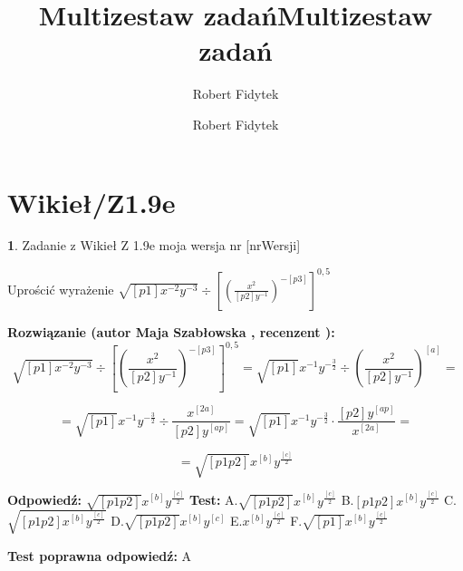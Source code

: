 \documentclass[12pt, a4paper]{article}
\title{Multizestaw zadań}
\author{Robert Fidytek}
\date{}\documentclass[12pt, a4paper]{article}
\title{Multizestaw zadań}
\author{Robert Fidytek}
\date{}
\theoremstyle{definition} %
\newtheorem{zad}{}
\theoremstyle{definition} %
\newtheorem{zad}{}
\newcommand{\kategoria}[1]{\section{#1}} %
\newcommand{\zadStart}[1]{\begin{zad}#1\newline} %
\newcommand{\zadStop}{\end{zad}}   %
\newcommand{\rozwStart}[2]{\noindent \textbf{Rozwiązanie (autor #1 , recenzent #2): }\newline} %
\newcommand{\rozwStop}{\newline}                                            %
\newcommand{\odpStart}{\noindent \textbf{Odpowiedź:}\newline}    %
\newcommand{\odpStop}{\newline}                                             %
\newcommand{\testStart}{\noindent \textbf{Test:}\newline} %
\newcommand{\testStop}{\newline} %
\newcommand{\kluczStart}{\noindent \textbf{Test poprawna odpowiedź:}\newline} %
\newcommand{\kluczStop}{\newline} %
\begin{document}
\maketitle


\kategoria{Wikieł/Z1.9e}
\zadStart{Zadanie z Wikieł Z 1.9e moja wersja nr [nrWersji]}


Uprościć wyrażenie $\sqrt{[p1]x^{-2}y^{-3}}\div[(\frac{x^{2}}{[p2]y^{-1}})^{-[p3]}]^{0,5}$

\zadStop

\rozwStart{Maja Szabłowska}{}
$$\sqrt{[p1]x^{-2}y^{-3}}\div\left[\left(\frac{x^{2}}{[p2]y^{-1}}\right)^{-[p3]}\right]^{0,5}=\sqrt{[p1]}x^{-1}y^{-\frac{3}{2}}\div\left(\frac{x^{2}}{[p2]y^{-1}}\right)^{[a]}=$$

$$=\sqrt{[p1]}x^{-1}y^{-\frac{3}{2}}\div \frac{x^{[2a]}}{[p2]y^{[ap]}}= \sqrt{[p1]}x^{-1}y^{-\frac{3}{2}}\cdot \frac{[p2]y^{[ap]}}{x^{[2a]}}=$$

$$=\sqrt{[p1p2]}x^{[b]}y^{\frac{[c]}{2}}$$
\rozwStop


\odpStart
$\sqrt{[p1p2]}x^{[b]}y^{\frac{[c]}{2}}$
\odpStop
\testStart
A.$\sqrt{[p1p2]}x^{[b]}y^{\frac{[c]}{2}}$
B.$[p1p2]x^{[b]}y^{\frac{[c]}{2}}$
C.$\sqrt{[p1p2]x^{[b]}y^{\frac{[c]}{2}}}$
D.$\sqrt{[p1p2]}x^{[b]}y^{[c]}$
E.$x^{[b]}y^{\frac{[c]}{2}}$
F.$\sqrt{[p1]}x^{[b]}y^{\frac{[c]}{2}}$


\testStop
\kluczStart
A
\kluczStop
\end{document}
